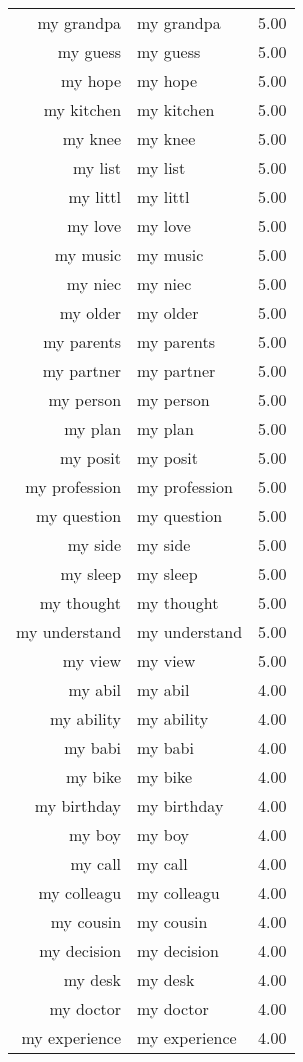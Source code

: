 \begin{table}[ht]
\begin{tabular}{rlr}
  my grandpa & my grandpa & 5.00 \\ 
  my guess & my guess & 5.00 \\ 
  my hope & my hope & 5.00 \\ 
  my kitchen & my kitchen & 5.00 \\ 
  my knee & my knee & 5.00 \\ 
  my list & my list & 5.00 \\ 
  my littl & my littl & 5.00 \\ 
  my love & my love & 5.00 \\ 
  my music & my music & 5.00 \\ 
  my niec & my niec & 5.00 \\ 
  my older & my older & 5.00 \\ 
  my parents & my parents & 5.00 \\ 
  my partner & my partner & 5.00 \\ 
  my person & my person & 5.00 \\ 
  my plan & my plan & 5.00 \\ 
  my posit & my posit & 5.00 \\ 
  my profession & my profession & 5.00 \\ 
  my question & my question & 5.00 \\ 
  my side & my side & 5.00 \\ 
  my sleep & my sleep & 5.00 \\ 
  my thought & my thought & 5.00 \\ 
  my understand & my understand & 5.00 \\ 
  my view & my view & 5.00 \\ 
  my abil & my abil & 4.00 \\ 
  my ability & my ability & 4.00 \\ 
  my babi & my babi & 4.00 \\ 
  my bike & my bike & 4.00 \\ 
  my birthday & my birthday & 4.00 \\ 
  my boy & my boy & 4.00 \\ 
  my call & my call & 4.00 \\ 
  my colleagu & my colleagu & 4.00 \\ 
  my cousin & my cousin & 4.00 \\ 
  my decision & my decision & 4.00 \\ 
  my desk & my desk & 4.00 \\ 
  my doctor & my doctor & 4.00 \\ 
  my experience & my experience & 4.00 \\ 

\end{tabular}
\end{table}
